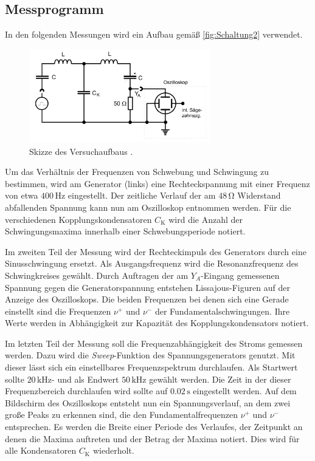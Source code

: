 \subsection{Messprogramm}
\label{subsec:Messprogramm}
In den folgenden Messungen wird ein Aufbau gemäß \autoref{fig:Schaltung2} verwendet. 
\begin{figure}
    \centering
	\includegraphics[width=0.7\textwidth]{content/Schaltung2.jpg}
    \caption{Skizze des Versuchaufbaus \cite{v355}.}
    \label{fig:Schaltung2}
\end{figure}
Um das Verhältnis der Frequenzen von Schwebung und Schwingung zu bestimmen, wird am Generator (links) eine Rechteckspannung mit einer Frequenz von etwa $400\, \unit{\hertz}$
eingestellt. Der zeitliche Verlauf der am $48 \, \unit{\ohm}$ Widerstand abfallenden Spannung kann nun am Oszilloskop entnommen werden. Für die verschiedenen 
Kopplungskondensatoren $C_\text{K}$ wird die Anzahl der Schwingungsmaxima innerhalb einer Schwebungsperiode notiert.

Im zweiten Teil der Messung wird der Rechteckimpuls des Generators durch eine Sinusschwingung ersetzt. Als Ausgangsfrequenz wird die Resonanzfrequenz des Schwingkreises
gewählt. Durch Auftragen der am $Y_A$-Eingang gemessenen Spannung gegen die Generatorspannung entstehen Lissajous-Figuren auf der Anzeige des Oszilloskops. Die beiden 
Frequenzen bei denen sich eine Gerade einstellt sind die Frequenzen $\nu^+$ und $\nu^-$ der Fundamentalschwingungen. Ihre Werte werden in Abhängigkeit zur Kapazität 
des Kopplungskondensators notiert.

Im letzten Teil der Messung soll die Frequenzabhängigkeit des Stroms gemessen werden. Dazu wird die \textit{Sweep}-Funktion des Spannungsgenerators genutzt. Mit dieser
lässt sich ein einstellbares Frequenzspektrum durchlaufen. Als Startwert sollte $20 \, \unit{\kilo\hertz}$- und als Endwert $50 \, \unit{\kilo\hertz}$ gewählt werden. Die Zeit 
in der dieser Frequenzbereich durchlaufen wird sollte auf $0.02 \, \unit{\second}$ eingestellt werden. Auf dem Bildschirm des Oszilloskops entsteht nun ein Spannungsverlauf,
an dem zwei große Peaks zu erkennen sind, die den Fundamentalfrequenzen $\nu^+$ und $\nu^-$ entsprechen. Es werden die Breite einer Periode des Verlaufes, der Zeitpunkt an
denen die Maxima auftreten und der Betrag der Maxima notiert. Dies wird für alle Kondensatoren $C_\text{K}$ wiederholt.
